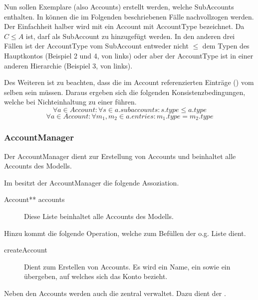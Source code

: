 Nun sollen Exemplare (also Accounts) erstellt werden, welche SubAccounts enthalten. In  können die im Folgenden beschriebenen Fälle nachvollzogen werden.
Der Einfachheit halber wird mit  ein Account  mit AccountType  bezeichnet. Da $C \leq A$ ist, darf  als SubAccount zu  hinzugefügt werden.
In den anderen drei Fällen ist der AccountType vom SubAccount entweder nicht $\leq$ dem Typen des Hauptkontos (Beispiel 2 und 4, von links) oder aber der AccountType ist in einer anderen Hierarchie (Beispiel 3, von links).


Des Weiteren ist zu beachten, dass die im Account referenzierten Einträge () vom selben 
 sein müssen. Daraus ergeben sich die folgenden Konsistenzbedingungen, 
welche bei Nichteinhaltung zu einer  führen.
\begin{equation}
	\forall a \in Account: \forall s \in a.subaccounts: s.type \leq a.type
\end{equation}
\begin{equation}
	\forall a \in Account: \forall m_1, m_2 \in a.entries: m_1.type = m_2.type
\end{equation}


\subsubsection{AccountManager}
Der AccountManager dient zur Erstellung von Accounts und beinhaltet alle Accounts des Modells.

Im \MM besitzt der AccountManager die folgende Assoziation.
\begin{description}
	\item[Account** accounts] Diese Liste beinhaltet alle Accounts des Modells.
\end{description}

Hinzu kommt die folgende Operation, welche zum Befüllen der o.g. Liste dient.
\begin{description}
	\item[createAccount] Dient zum Erstellen von Accounts. Es wird ein Name, ein  sowie ein  übergeben, auf welches sich das Konto bezieht.
\end{description}

Neben den Accounts werden auch die  zentral verwaltet. Dazu dient der .


